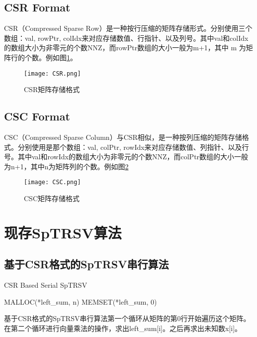 \subsection{CSR Format}

CSR（Compressed Sparse Row）是一种按行压缩的矩阵存储形式。分别使用三个数组：val, rowPtr, colIdx来对应存储数值、行指针、以及列号。其中val和colIdx的数组大小为非零元的个数NNZ，而rowPtr数组的大小一般为m+1，其中 m 为矩阵行的个数。例如图\ref{CSR}。

\begin{figure}[htbp]
    \centering
    \texttt{[image: CSR.png]}
    \caption{CSR矩阵存储格式}
    \label{CSR}
\end{figure}

\subsection{CSC Format}

CSC（Compressed Sparse Column）与CSR相似，是一种按列压缩的矩阵存储格式。分别使用是那个数组：val, colPtr, rowIdx来对应存储数值、列指针、以及行号。其中val和rowIdx的数组大小为非零元的个数NNZ，而colPtr数组的大小一般为n+1，其中n为矩阵列的个数。例如图\ref{CSC}

\begin{figure}[htbp]
    \centering
    \texttt{[image: CSC.png]}
    \caption{CSC矩阵存储格式}
    \label{CSC}
\end{figure}

\section{现存SpTRSV算法}

\subsection{基于CSR格式的SpTRSV串行算法}

\begin{algorithm}[H]
    \caption{CSR Based Serial SpTRSV}\label{csr-serial-sptrsv}
    MALLOC(*left\_sum, n) \;
    MEMSET(*left\_sum, 0) \;
\end{algorithm}

基于CSR格式的SpTRSV串行算法第一个循环从矩阵的第0行开始遍历这个矩阵。在第二个循环进行向量乘法的操作，求出left\_sum[i]。之后再求出未知数x[i]。

